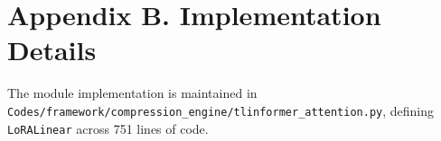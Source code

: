 \section*{Appendix B. Implementation Details}
The module implementation is maintained in \texttt{Codes/framework/compression\_engine/tlinformer\_attention.py}, defining \texttt{LoRALinear} across 751 lines of code.
